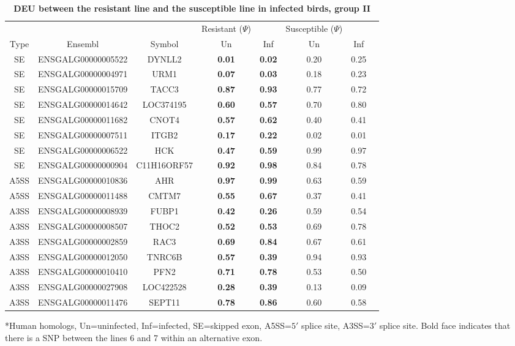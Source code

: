 \begin{landscape}
\begin{table}[!ht]
\caption{
\textbf{DEU between the resistant line and the susceptible line
in infected birds, group II}
}
\begin{center}
\begin{tabular}{cccccccc}
\hline
& & & Resistant ($\Psi$) & & Susceptible ($\Psi$) & \\
Type & Ensembl & Symbol  & Un & Inf & Un & Inf \\
\hline
SE & ENSGALG00000005522 & DYNLL2 & \textbf{0.01} & \textbf{0.02} & 0.20 & 0.25 \\
SE & ENSGALG00000004971 & URM1 & \textbf{0.07} & \textbf{0.03} & 0.18 & 0.23 \\
SE & ENSGALG00000015709 & TACC3 & \textbf{0.87} & \textbf{0.93} & 0.77 & 0.72 \\
SE & ENSGALG00000014642 & LOC374195 & \textbf{0.60} & \textbf{0.57} & 0.70 & 0.80 \\
SE & ENSGALG00000011682 & CNOT4 & \textbf{0.57} & \textbf{0.62} & 0.40 & 0.41 \\
SE & ENSGALG00000007511 & ITGB2 & \textbf{0.17} & \textbf{0.22} & 0.02 & 0.01 \\
SE & ENSGALG00000006522 & HCK & \textbf{0.47} & \textbf{0.59} & 0.99 & 0.97 \\
SE & ENSGALG00000000904 & C11H16ORF57 & \textbf{0.92} & \textbf{0.98} & 0.84 & 0.78 \\
A5SS & ENSGALG00000010836 & AHR & \textbf{0.97} & \textbf{0.99} & 0.63 & 0.59 \\
A5SS & ENSGALG00000011488 & CMTM7 & \textbf{0.55} & \textbf{0.67} & 0.37 & 0.41 \\
A3SS & ENSGALG00000008939 & FUBP1 & \textbf{0.42} & \textbf{0.26} & 0.59 & 0.54 \\
A3SS & ENSGALG00000008507 & THOC2 & \textbf{0.52} & \textbf{0.53} & 0.69 & 0.78 \\
A3SS & ENSGALG00000002859 & RAC3 & \textbf{0.69} & \textbf{0.84} & 0.67 & 0.61 \\
A3SS & ENSGALG00000012050 & TNRC6B & \textbf{0.57} & \textbf{0.39} & 0.94 & 0.93 \\
A3SS & ENSGALG00000010410 & PFN2 & \textbf{0.71} & \textbf{0.78} & 0.53 & 0.50 \\
A3SS & ENSGALG00000027908 & LOC422528 & \textbf{0.28} & \textbf{0.39} & 0.13 & 0.09 \\
A3SS & ENSGALG00000011476 & SEPT11 & \textbf{0.78} & \textbf{0.86} & 0.60 & 0.58 \\
\hline
\end{tabular}
\begin{flushleft}
    *Human homologs, Un=uninfected, Inf=infected, SE=skipped exon,
    A5SS=$5\prime$ splice site, A3SS=$3\prime$ splice site.  Bold face
    indicates that there is a SNP between the lines 6 and 7
    within an alternative exon.
\end{flushleft}
\label{tab:line67i_diff_line67u_two}
\end{center}
\end{table}


\end{landscape}
